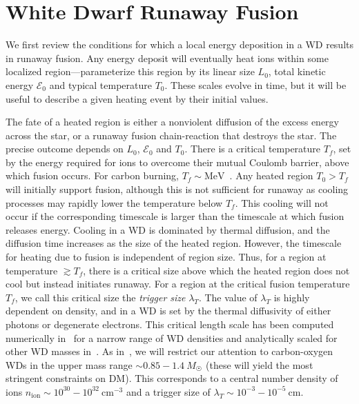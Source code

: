 \documentclass[preprintnumbers,amsmath,amssymb,prd,superscriptaddress]{revtex4}
\newcommand{\Ez}{\mathcal{E}_0}
\newcommand{\MeV}{\text{MeV}}
\newcommand{\cm}{\text{cm}}
\begin{document}
\section{White Dwarf Runaway Fusion}
\label{sec:boomreview}
We first review the conditions for which a local energy deposition in a WD results in runaway fusion.
Any energy deposit will eventually heat ions within some localized region---parameterize this region by its linear size $L_0$, total kinetic energy $\Ez$ and typical temperature $T_0$.
These scales evolve in time, but it will be useful to describe a given heating event by their initial values.

The fate of a heated region is either a nonviolent diffusion of the excess energy across the star, or a runaway fusion chain-reaction that destroys the star.
The precise outcome depends on $L_0$, $\Ez$ and $T_0$.
There is a critical temperature $T_f$, set by the energy required for ions to overcome their mutual Coulomb barrier, above which fusion occurs.
For carbon burning, $T_f \sim \MeV$~\cite{Gasques:2005ar}.
Any heated region $T_0 > T_f$ will initially support fusion, although this is not sufficient for runaway as cooling processes may rapidly lower the temperature below $T_f$.
This cooling will not occur if the corresponding timescale is larger than the timescale at which fusion releases energy.
Cooling in a WD is dominated by thermal diffusion, and the diffusion time increases as the size of the heated region.
However, the timescale for heating due to fusion is independent of region size.
Thus, for a region at temperature $\gtrsim T_f$, there is a critical size above which the heated region does not cool but instead initiates runaway.
For a region at the critical fusion temperature $T_f$, we call this critical size the \emph{trigger size} $\lambda_T$.
The value of $\lambda_T$ is highly dependent on density, and in a WD is set by the thermal diffusivity of either photons or degenerate electrons.
This critical length scale has been computed numerically in~\cite{Woosley} for a narrow range of WD densities and analytically scaled for other WD masses in~\cite{Graham:2015apa}.
As in~\cite{Graham:2015apa}, we will restrict our attention to carbon-oxygen WDs in the upper mass range $\sim 0.85 - 1.4 ~M_{\astrosun}$ (these will yield the most stringent constraints on DM).
This corresponds to a central number density of ions $n_\text{ion} \sim 10^{30} - 10^{32} ~\cm^{-3}$ and a trigger size of $\lambda_T \sim 10^{-3} - 10^{-5} ~\text{cm}$.
\end{document}
